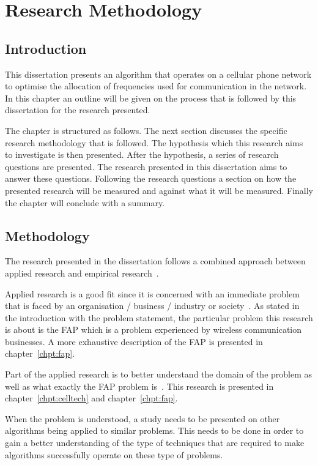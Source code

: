 \chapter{Research Methodology}
\section{Introduction}
This dissertation presents an algorithm that operates on a cellular phone network to optimise the allocation of frequencies used for communication in the network. In this chapter an outline will be given on the process that is followed by this dissertation for the research presented.

The chapter is structured as follows. The next section discusses the specific research methodology that is followed. The hypothesis which this research aims to investigate is then presented. After the hypothesis, a series of research questions are presented. The research presented in this dissertation aims to answer these questions.
Following the research questions a section on how the presented research will be measured and against what it will be measured. Finally the chapter will conclude with a summary.
\section{Methodology}
The research presented in the dissertation follows a combined approach between applied research and empirical research~\cite{researchmeth}. 

Applied research is a good fit since it is concerned with an immediate problem that is faced by an organisation / business / industry or society~\cite{researchmeth}. As stated in the introduction with the problem statement, the particular problem this research is about is the \gls{FAP} which is a problem experienced by wireless communication businesses. A more exhaustive description of the \gls{FAP} is presented in chapter~\ref{chpt:fap}.

Part of the applied research is to better understand the domain of the problem as well as what exactly the \gls{FAP} problem is~\cite{researchmeth}. This research is presented in chapter~\ref{chpt:celltech} and chapter~\ref{chpt:fap}.

When the problem is understood, a study needs to be presented on other algorithms being applied to similar problems. This needs to be done in order to gain a better understanding of the type of techniques that are required to make algorithms successfully operate on these type of problems.

